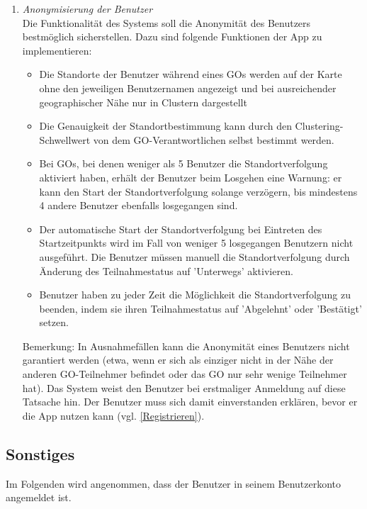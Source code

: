 \documentclass[parskip=full]{scrartcl}
\def\threedigits#1{%
  \ifnum#1<100 0\fi
  \ifnum#1<10 0\fi
  \number#1}
\begin{document}
\begin{enumerate}[label={\textbf{/F\protect\threedigits{\theenumi}0/}}, leftmargin=*, resume]
\item \textit{Anonymisierung der Benutzer}\label{Anonymisierung} \\ Die Funktionalität des Systems soll die Anonymität des Benutzers bestmöglich sicherstellen. Dazu sind folgende Funktionen der App zu implementieren:
		\begin{itemize}
			\item Die Standorte der Benutzer während eines GOs werden auf der Karte ohne den jeweiligen Benutzernamen angezeigt und bei ausreichender geographischer Nähe nur in Clustern dargestellt
			\item \colorbox{shadecolor}{\parbox{0.85\textwidth}{Die Genauigkeit der Standortbestimmung kann durch den Clustering-Schwellwert von dem GO-Verantwortlichen selbst bestimmt werden.}}
			\item \colorbox{shadecolor}{\parbox{.85\textwidth}{Bei GOs, bei denen weniger als 5 Benutzer die Standortverfolgung aktiviert haben, erhält der Benutzer beim Losgehen eine Warnung: er kann den Start der Standortverfolgung solange verzögern, bis mindestens 4 andere Benutzer ebenfalls losgegangen sind.}}
			\item Der automatische Start der Standortverfolgung bei Eintreten des Startzeitpunkts wird im Fall von weniger 5 losgegangen Benutzern nicht ausgeführt. Die Benutzer müssen manuell die Standortverfolgung durch Änderung des Teilnahmestatus auf 'Unterwegs' aktivieren.
			\item Benutzer haben zu jeder Zeit die Möglichkeit die Standortverfolgung zu beenden, indem sie ihren Teilnahmestatus auf 'Abgelehnt' oder 'Bestätigt' setzen.
		\end{itemize}
		Bemerkung: In Ausnahmefällen kann die Anonymität eines Benutzers nicht garantiert werden (etwa, wenn er sich als einziger nicht in der Nähe der anderen GO-Teilnehmer befindet oder das GO nur sehr wenige Teilnehmer hat). Das System weist den Benutzer bei erstmaliger Anmeldung auf diese Tatsache hin. Der Benutzer muss sich damit einverstanden erklären, bevor er die App nutzen kann (vgl. \ref{Registrieren}).
		
\end{enumerate}

\subsection{Sonstiges}
Im Folgenden wird angenommen, dass der Benutzer in seinem Benutzerkonto angemeldet ist.
\end{document}
